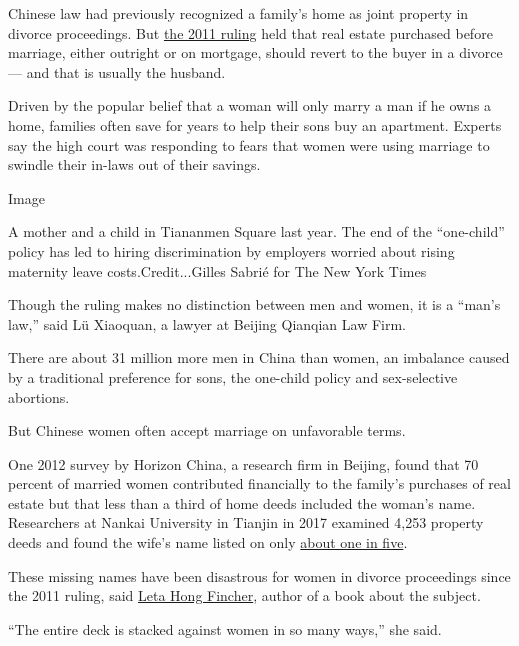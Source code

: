 Chinese law had previously recognized a family's home as joint property
in divorce proceedings. But
\href{https://www.nytimes.com/2011/09/08/world/asia/08iht-letter08.html}{the
2011 ruling} held that real estate purchased before marriage, either
outright or on mortgage, should revert to the buyer in a divorce --- and
that is usually the husband.

Driven by the popular belief that a woman will only marry a man if he
owns a home, families often save for years to help their sons buy an
apartment. Experts say the high court was responding to fears that women
were using marriage to swindle their in-laws out of their savings.

Image

A mother and a child in Tiananmen Square last year. The end of the
``one-child'' policy has led to hiring discrimination by employers
worried about rising maternity leave costs.Credit...Gilles Sabrié for
The New York Times

Though the ruling makes no distinction between men and women, it is a
``man's law,'' said Lü Xiaoquan, a lawyer at Beijing Qianqian Law Firm.

There are about 31 million more men in China than women, an imbalance
caused by a traditional preference for sons, the one-child policy and
sex-selective abortions.

But Chinese women often accept marriage on unfavorable terms.

One 2012 survey by Horizon China, a research firm in Beijing, found that
70 percent of married women contributed financially to the family's
purchases of real estate but that less than a third of home deeds
included the woman's name. Researchers at Nankai University in Tianjin
in 2017 examined 4,253 property deeds and found the wife's name listed
on only
\href{https://www.academia.edu/35082071/_and_ldquo_\%E6\%88\%BF\%E4\%BA\%A7\%E8\%AF\%81\%E4\%B8\%8A\%E7\%9A\%84\%E7\%88\%B1\%E6\%83\%85_and_quot_and_mdash_and_mdash_and_mdash_\%E5\%A9\%9A\%E5\%A7\%BB\%E5\%B8\%82\%E5\%9C\%BA\%E4\%B8\%8E\%E5\%AE\%B6\%E5\%BA\%AD\%E6\%88\%BF\%E4\%BA\%A7\%E4\%BA\%A7\%E6\%9D\%83\%E5\%88\%86\%E5\%B8\%83}{about
one in five}.

These missing names have been disastrous for women in divorce
proceedings since the 2011 ruling, said
\href{https://www.letahongfincher.com/about}{Leta Hong Fincher}, author
of a book about the subject.

``The entire deck is stacked against women in so many ways,'' she said.

